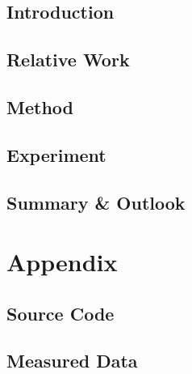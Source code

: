 \documentclass[twoside,a4paper,11pt,openright]{report}
\begin{document}
%
%




\cleardoublepage


\cleardoublepage


\tableofcontents




%
%

\cleardoublepage
{}

\chapter{Introduction}


\chapter{Relative Work}


\chapter{Method}


\chapter{Experiment}

\chapter{Summary \& Outlook}


%
%

\appendix
\part*{Appendix}
\markboth{}{}


\chapter{Source Code}

\chapter{Measured Data}


\printbibliography


\cleardoublepage

\cleardoublepage

\end{document}
